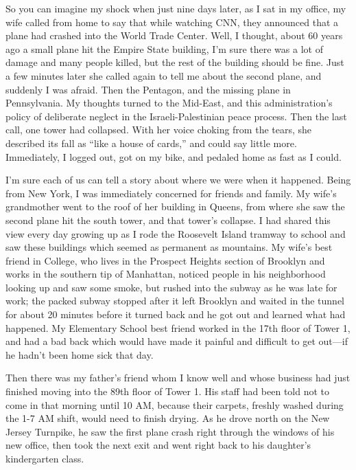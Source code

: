 \documentclass{report}
\begin{document}
So you can imagine my shock when just nine days later, as I sat in my office,
my wife called from home to say that while watching CNN, they announced that a
plane had crashed into the World Trade Center.  Well, I thought, about 60 years
ago a small plane hit the Empire State building, I'm sure there was a lot of
damage and many people killed, but the rest of the building should be fine.
Just a few minutes later she called again to tell me about the second plane,
and suddenly I was afraid.  Then the Pentagon, and the missing plane in
Pennsylvania.  My thoughts turned to the Mid-East, and this administration's
policy of deliberate neglect in the Israeli-Palestinian peace process.  Then
the last call, one tower had collapsed.  With her voice choking from the tears,
she described its fall as ``like a house of cards,'' and could say little more.
Immediately, I logged out, got on my bike, and pedaled home as fast as I could.

I'm sure each of us can tell a story about where we were when it happened.
Being from New York, I was immediately concerned for friends and family.  My
wife's grandmother went to the roof of her building in Queens, from where she
saw the second plane hit the south tower, and that tower's collapse.  I had
shared this view every day growing up as I rode the Roosevelt Island tramway to
school and saw these buildings which seemed as permanent as mountains.  My
wife's best friend in College, who lives in the Prospect Heights section of
Brooklyn and works in the southern tip of Manhattan, noticed people in his
neighborhood looking up and saw some smoke, but rushed into the subway as he
was late for work; the packed subway stopped after it left Brooklyn and waited
in the tunnel for about 20 minutes before it turned back and he got out and
learned what had happened.  My Elementary School best friend worked in the 17th
floor of Tower 1, and had a bad back which would have made it painful and
difficult to get out---if he hadn't been home sick that day.

Then there was my father's friend whom I know well and whose business had just
finished moving into the 89th floor of Tower 1.  His staff had been told not to
come in that morning until 10 AM, because their carpets, freshly washed during
the 1-7 AM shift, would need to finish drying.  As he drove north on the New
Jersey Turnpike, he saw the first plane crash right through the windows of his
new office, then took the next exit and went right back to his daughter's
kindergarten class.
\end{document}
